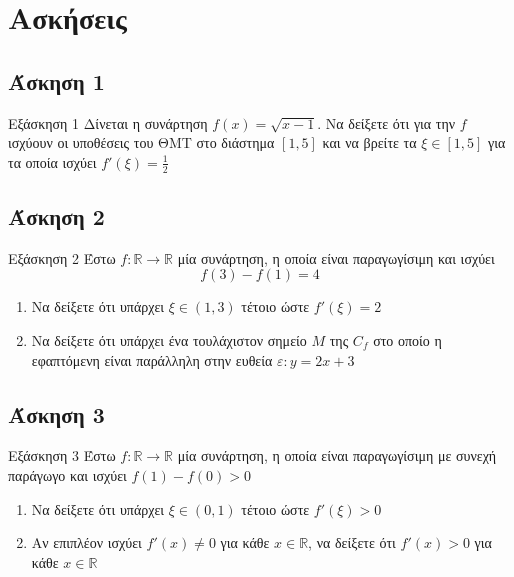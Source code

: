 \documentclass[greek]{beamer}
\begin{document}
\section{Ασκήσεις}
\subsection{Άσκηση 1}
\begin{frame}[label=Άσκηση1]{Εξάσκηση 1}
  Δίνεται η συνάρτηση $f(x)=\sqrt{x-1}$. Να δείξετε ότι για την $f$ ισχύουν οι υποθέσεις του ΘΜΤ στο διάστημα $[1,5]$ και να βρείτε τα $ξ\in [1,5]$ για τα οποία ισχύει $f'(ξ)=\frac{1}{2}$

\end{frame}

\subsection{Άσκηση 2}
\begin{frame}[label=Άσκηση2]{Εξάσκηση 2}
  Έστω $f:\mathbb{R}\to\mathbb{R}$ μία συνάρτηση, η οποία είναι παραγωγίσιμη και ισχύει
  $$f(3)-f(1)=4$$
  \begin{enumerate}
    \item<1-> Να δείξετε ότι υπάρχει $ξ\in (1,3)$ τέτοιο ώστε $f'(ξ)=2$
    \item<2-> Να δείξετε ότι υπάρχει ένα τουλάχιστον σημείο $Μ$ της $C_f$ στο οποίο η εφαπτόμενη είναι παράλληλη στην ευθεία $ε:y=2x+3$
  \end{enumerate}

\end{frame}

\subsection{Άσκηση 3}
\begin{frame}[label=Άσκηση3]{Εξάσκηση 3}
  Έστω $f:\mathbb{R}\to\mathbb{R}$ μία συνάρτηση, η οποία είναι παραγωγίσιμη με συνεχή παράγωγο και ισχύει $f(1)-f(0)>0$
  \begin{enumerate}
    \item<1-> Να δείξετε ότι υπάρχει $ξ\in (0,1)$ τέτοιο ώστε $f'(ξ)>0$
    \item<2-> Αν επιπλέον ισχύει $f'(x)\ne 0$ για κάθε $x\in\mathbb{R}$, να δείξετε ότι $f'(x)>0$ για κάθε $x\in\mathbb{R}$
  \end{enumerate}

\end{frame}
\end{document}
